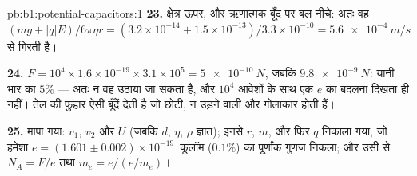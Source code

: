\begin{solution}{pb:b1:potential-capacitors:1}
\textbf{23.} क्षेत्र ऊपर, और ऋणात्मक बूँद पर बल नीचे: अतः वह $(mg
+ |q|E)/6\pi\eta r = (3.2 \times 10^{-14} + 1.5 \times 10^{-13})/3.3 \times 10^{-10} =
\qty{5.6e-4}{m/s}$ से गिरती है।

\textbf{24.} $F = 10^4 \times 1.6 \times 10^{-19} \times 3.1 \times 10^5 = \qty{5e-10}{N}$,
जबकि $\qty{9.8e-9}{N}$: यानी भार का $5\%$ --- अतः न वह उठाया जा सकता है, और
$10^4$ आवेशों के साथ एक $e$ का बदलना दिखता ही नहीं। तेल की फुहार ऐसी बूँदें
देती है जो छोटी, न उड़ने वाली और गोलाकार होती हैं।

\textbf{25.} मापा गया: $v_1$, $v_2$ और $U$ (जबकि $d$, $\eta$, $\rho$ ज्ञात);
इनसे $r$, $m$, और फिर $q$ निकाला गया, जो हमेशा
$e = (1.601 \pm 0.002) \times 10^{-19}$~कूलॉम ($0.1\%$) का पूर्णांक गुणज
निकला; और उसी से $N_A = F/e$ तथा $m_e = e/(e/m_e)$।
\end{solution}
